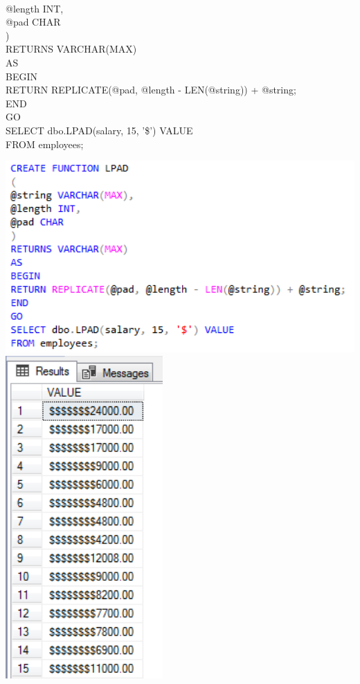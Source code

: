 \begin{enumerate}[1.]
	\\@length INT,          
	\\@pad CHAR             
	\\)
	\\RETURNS VARCHAR(MAX)
	\\AS
	\\BEGIN
	    \\RETURN REPLICATE(@pad, @length - LEN(@string)) + @string;
	\\END
	\\GO
	\\SELECT dbo.LPAD(salary, 15, '\$') VALUE
	\\FROM employees;
	\begin{center}
		\includegraphics[width=14cm]{./Imagenes/actividad_05_07a}
		\includegraphics[width=6cm]{./Imagenes/actividad_05_07}
	\end{center}


\end{enumerate}
